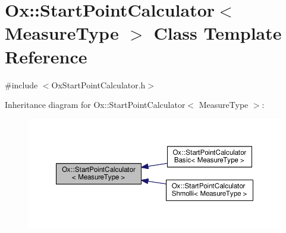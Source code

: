 \hypertarget{class_ox_1_1_start_point_calculator}{\section{Ox\-:\-:Start\-Point\-Calculator$<$ Measure\-Type $>$ Class Template Reference}
\label{class_ox_1_1_start_point_calculator}
}


{\ttfamily \#include $<$Ox\-Start\-Point\-Calculator.\-h$>$}



Inheritance diagram for Ox\-:\-:Start\-Point\-Calculator$<$ Measure\-Type $>$\-:
\nopagebreak
\begin{figure}[H]
\begin{center}
\leavevmode
\includegraphics[width=350pt]{class_ox_1_1_start_point_calculator__inherit__graph}
\end{center}
\end{figure}
